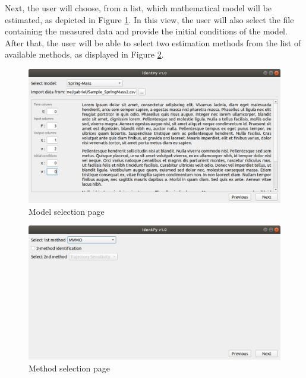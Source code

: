 Next, the user will choose, from a list, which mathematical model will be estimated, as depicted in Figure \ref{fig: model_selection}. In this view, the user will also select the file containing the measured data and provide the initial conditions of the model. After that, the user will be able to select two estimation methods from the list of available methods, as displayed in Figure \ref{fig: method_selection}.

\begin{figure}[!h]
	\caption{Model selection page}
	\begin{center}
		\includegraphics[scale=.5]{Images/Software_model_page.eps}
	\end{center}
	\label{fig: model_selection}
\end{figure}

\begin{figure}[!h]
	\caption{Method selection page}
	\begin{center}
		\includegraphics[scale=.5]{Images/Software_method_page.eps}
	\end{center}
	\label{fig: method_selection}
\end{figure}

